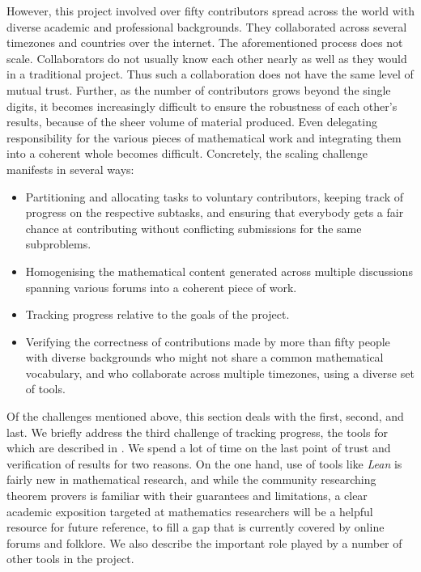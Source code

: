 \documentclass[12pt]{amsart}
\theoremstyle{definition}
\begin{document}
However, this project involved over fifty contributors spread across the world with diverse academic and professional backgrounds. They collaborated across several timezones and countries over the internet. The aforementioned process does not scale. Collaborators do not usually know each other nearly as well as they would in a traditional project. Thus such a collaboration does not have the same level of mutual trust. Further, as the number of contributors grows beyond the single digits, it becomes increasingly difficult to ensure the robustness of each other's results, because of the sheer volume of material produced. Even delegating responsibility for the various pieces of mathematical work and integrating them into a coherent whole becomes difficult. Concretely, the scaling challenge manifests in several ways:
\begin{itemize}
    \item Partitioning and allocating tasks to voluntary contributors, keeping track of progress on the respective subtasks, and ensuring that everybody gets a fair chance at contributing without conflicting submissions for the same subproblems.
    \item Homogenising the mathematical content generated across multiple discussions spanning various forums into a coherent piece of work.
    \item Tracking progress relative to the goals of the project.
    \item Verifying the correctness of contributions made by more than fifty people with diverse backgrounds who might not share a common mathematical vocabulary, and who collaborate across multiple timezones, using a diverse set of tools.
\end{itemize}

Of the challenges mentioned above, this section deals with the first, second, and last. We briefly address the third challenge of tracking progress, the tools for which are described in . We spend a lot of time on the last point of trust and verification of results for two reasons. On the one hand, use of tools like \emph{Lean} is fairly new in mathematical research, and while the community researching theorem provers is familiar with their guarantees and limitations, a clear academic exposition targeted at mathematics researchers will be a helpful resource for future reference, to fill a gap that is currently covered by online forums and folklore. We also describe the important role played by a number of other tools in the project.
\end{document}
